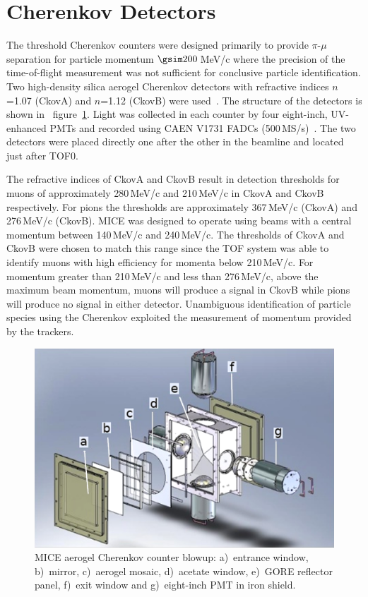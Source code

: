 \graphicspath{{03-Ckov/Figures/}}

\section{Cherenkov Detectors}
\label{Sect:Ckov}

The threshold Cherenkov counters were designed primarily to provide
$\pi$-$\mu$ separation for particle momentum $\gsim 200$\,MeV/c where
the precision of the time-of-flight measurement was not sufficient for
conclusive particle identification.
Two high-density silica aerogel Cherenkov detectors with refractive
indices $n$=1.07 (CkovA) and $n$=1.12 (CkovB) were
used~\cite{Cremaldi:2009zj}.
The structure of the detectors is shown in ~figure~\ref{fig:ckov1}.
Light was collected in each counter by four eight-inch, UV-enhanced
PMTs and recorded using CAEN V1731 FADCs (500\,MS/s)~\cite{NOTE473}.
The two detectors were placed directly one after the other in the
beamline and located just after TOF0.

The refractive indices of CkovA and CkovB result in detection
thresholds for muons of approximately 280\,MeV/c and 210\,MeV/c in
CkovA and CkovB respectively.
For pions the thresholds are approximately 367\,MeV/c (CkovA) and
276\,MeV/c (CkovB).
MICE was designed to operate using beams with a central momentum
between 140\,MeV/c and 240\,MeV/c.
The thresholds of CkovA and CkovB were chosen to match this range
since the TOF system was able to identify muons with high efficiency
for momenta below 210\,MeV/c.
For momentum greater than 210\,MeV/c and less than 276\,MeV/c, above
the maximum beam momentum, muons will produce a signal in CkovB while
pions will produce no signal in either detector.
Unambiguous identification of particle species using the Cherenkov
exploited the measurement of momentum provided by the trackers. 
\begin{figure}
  \begin{center}
    \includegraphics[width=0.6\columnwidth]{./03-Ckov/Figures/Ckov_fix.png}
  \end{center}
  \caption{
    MICE aerogel Cherenkov counter blowup: a)~entrance window,
    b)~mirror, c)~aerogel mosaic, d)~acetate window, e)~GORE reflector
    panel, f)~exit window and g)~eight-inch PMT in iron shield.
  } 
  \label{fig:ckov1}
\end{figure}

